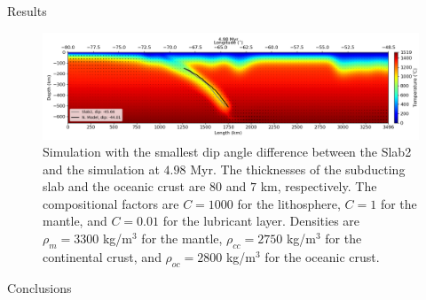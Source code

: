 \documentclass[final]{beamer}
\newlength{\colwidth}
\begin{document}
\begin{frame}[t]
\begin{columns}[t]
\begin{column}{\colwidth}
\begin{block}{Results}
  \begin{figure}
    \centering
    \includegraphics[width=0.3\paperwidth]{figures/angle-step_204.png}
    \caption{Simulation with the smallest dip angle difference between the Slab2 and the simulation at $4.98$ Myr. The thicknesses of the subducting slab and the oceanic crust are $80$ and $7$ km, respectively. The compositional factors are $C = 1000$ for the lithosphere, $C=1$ for the mantle, and $C=0.01$ for the lubricant layer. Densities are $\rho_m=3300$ kg/m$^3$ for the mantle, $\rho_{cc}=2750$ kg/m$^3$ for the continental crust, and $\rho_{oc}=2800$ kg/m$^3$ for the oceanic crust.}
    \label{fig:result4}
  \end{figure}

  \end{block}

  \begin{block}{Conclusions}


\end{block}
\end{column}
\end{columns}
\end{frame}
\end{document}
